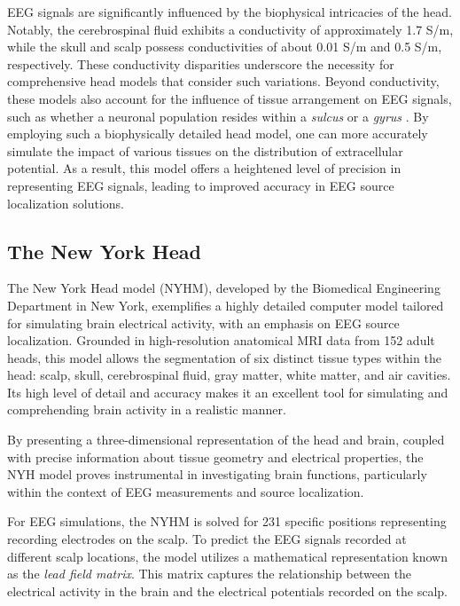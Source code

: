 \documentclass[a4paper, UKenglish, 11pt]{uiomaster}
\begin{document}
EEG signals are significantly influenced by the biophysical intricacies of the head. Notably, the cerebrospinal fluid exhibits a conductivity of approximately 1.7 S/m, while the skull and scalp possess conductivities of about 0.01 S/m and 0.5 S/m, respectively. These conductivity disparities underscore the necessity for comprehensive head models that consider such variations. Beyond conductivity, these models also account for the influence of tissue arrangement on EEG signals, such as whether a neuronal population resides within a \emph{sulcus} or a \emph{gyrus} \cite{naess2021biophysically}. By employing such a biophysically detailed head model, one can more accurately simulate the impact of various tissues on the distribution of extracellular potential. As a result, this model offers a heightened level of precision in representing EEG signals, leading to improved accuracy in EEG source localization solutions.

\subsection{The New York Head}
The New York Head model (NYHM), developed by the Biomedical Engineering Department in New York, exemplifies a highly detailed computer model tailored for simulating brain electrical activity, with an emphasis on EEG source localization. Grounded in high-resolution anatomical MRI data from 152 adult heads, this model allows the segmentation of six distinct tissue types within the head: scalp, skull, cerebrospinal fluid, gray matter, white matter, and air cavities. Its high level of detail and accuracy makes it an excellent tool for simulating and comprehending brain activity in a realistic manner.

By presenting a three-dimensional representation of the head and brain, coupled with precise information about tissue geometry and electrical properties, the NYH model proves instrumental in investigating brain functions, particularly within the context of EEG measurements and source localization.

For EEG simulations, the NYHM is solved for 231 specific positions representing recording electrodes on the scalp. To predict the EEG signals recorded at different scalp locations, the model utilizes a mathematical representation known as the \emph{lead field matrix}. This matrix captures the relationship between the electrical activity in the brain and the electrical potentials recorded on the scalp.
\end{document}
